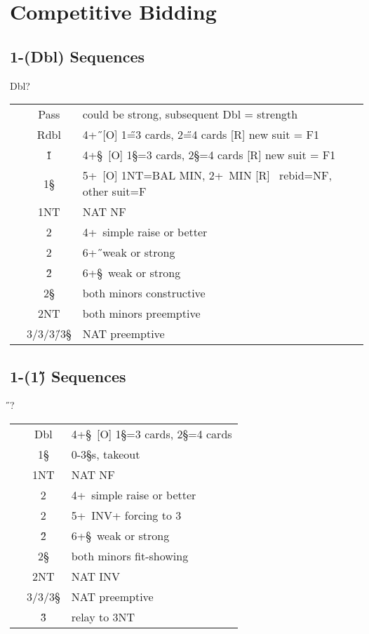 \hypertarget{1dcomp}{}
\section{Competitive Bidding}

\subsection{1\D-(Dbl) Sequences}

\begin{bidding}
\>\D\>Dbl\>?
\end{bidding}

\begin{longtable}{C{\linklength} C{\bidlength} l}
& Pass & could be strong, subsequent Dbl = strength \\
& Rdbl & 4+\H\ [O] 1\H=3 cards, 2\H=4 cards [R] new suit = F1 \\
& 1\H & 4+\S \ [O] 1\S=3 cards, 2\S=4 cards [R] new suit = F1 \\
& 1\S & 5+\C\ [O] 1NT=BAL MIN, 2+\C\ MIN [R] \C\ rebid=NF, other suit=F \\
& 1NT & NAT NF \\
& 2\C & 4+\D\ simple raise or better \\
& 2\D & 6+\H\ weak or strong \\
& 2\H & 6+\S\ weak or strong \\
& 2\S & both minors constructive \\
& 2NT & both minors preemptive \\
& 3\C/3\D/3\H/3\S & NAT preemptive \\ 
\end{longtable}

\subsection{1\D-(1\H) Sequences}

\begin{bidding}
\>\D{}\H\>?
\end{bidding}

\begin{longtable}{C{\linklength} C{\bidlength} l}
& Dbl & 4+\S \ [O] 1\S=3 cards, 2\S=4 cards \\
& 1\S & 0-3\S s, takeout \\
& 1NT & NAT NF \\
& 2\C & 4+\D\ simple raise or better \\
& 2\D & 5+\C\  INV+ forcing to 3\C \\
& 2\H & 6+\S\ weak or strong \\
& 2\S & both minors fit-showing \\
& 2NT & NAT INV \\
& 3\C/3\D/3\S & NAT preemptive \\ 
& 3\H & relay to 3NT \\ 
\end{longtable}

